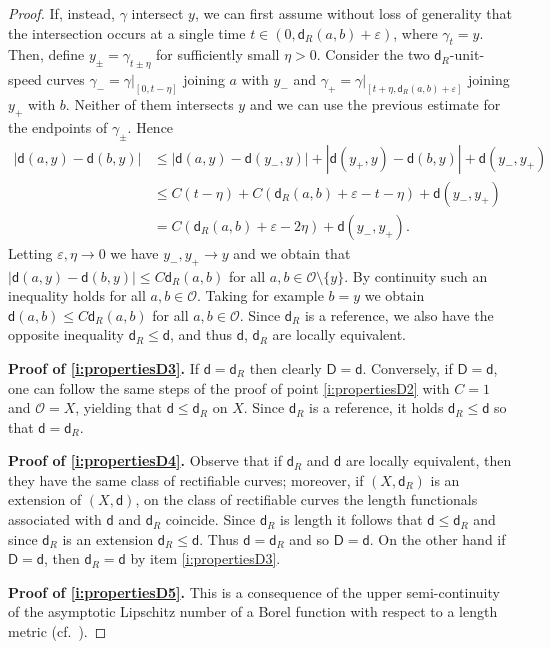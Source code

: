 \documentclass[11pt,a4paper]{article}
\theoremstyle{plain}
\theoremstyle{definition}
\theoremstyle{remark}
\numberwithin{equation}{section}
\newcommand{\sfd}{\mathsf d}
\newcommand{\sfD}{\mathsf D}
\begin{document}
\begin{proof}
If, instead, $\gamma$ intersect $y$, we can first assume without loss of generality that the intersection occurs at a single time $t \in (0,\sfd_R(a,b)+\varepsilon)$, where $\gamma_t = y$. Then, define $y_\pm =\gamma_{t\pm \eta}$ for sufficiently small $\eta>0$. Consider the two $\sfd_R$-unit-speed curves $\gamma_- = \gamma|_{[0,t-\eta]}$ joining $a$ with $y_-$ and $\gamma_+ = \gamma|_{[t+\eta,\sfd_R(a,b)+\varepsilon]}$ joining $y_+$ with $b$. Neither of them intersects $y$ and we can use the previous estimate for the endpoints of $\gamma_\pm$. Hence
\begin{align}
|\sfd(a,y)-\sfd(b,y)| & \leq |\sfd(a,y)-\sfd(y_-,y)| + |\sfd(y_+,y)-\sfd(b,y)| + \sfd(y_-,y_+) \\
& \leq C(t-\eta) + C(\sfd_R(a,b) +\varepsilon-t-\eta)   + \sfd(y_-,y_+) \\
& = C(\sfd_R(a,b)+\varepsilon-2\eta)  + \sfd(y_-,y_+).
\end{align}
Letting $\varepsilon,\eta\to 0$ we have $y_-,y_+ \to y$ and we obtain that $|\sfd(a,y)-\sfd(b,y)| \leq C \sfd_R(a,b)$ for all $a,b\in \mathcal{O}\setminus \{y\}$. By continuity such an inequality holds for all $a,b\in \mathcal{O}$. Taking for example $b=y$ we obtain $\sfd(a,b) \leq C \sfd_R(a,b)$ for all $a,b\in \mathcal{O}$. Since $\sfd_R$ is a reference, we also have the opposite inequality $\sfd_R\leq \sfd$, and thus $\sfd$, $\sfd_R$ are locally equivalent.

\textbf{Proof of \ref{i:propertiesD3}.} If $\sfd=\sfd_R$ then clearly $\sfD=\sfd$. Conversely, if $\sfD=\sfd$,  one can follow the same steps of the proof of point \ref{i:propertiesD2} with $C=1$ and $\mathcal{O}=X$, yielding that $\sfd\leq \sfd_R$ on $X$. Since $\sfd_R$ is a reference, it holds $\sfd_R\leq \sfd$ so that $\sfd=\sfd_R$.

\textbf{Proof of \ref{i:propertiesD4}.} Observe that if $\sfd_R$ and $\sfd$ are locally equivalent, then they have the same class of rectifiable curves; moreover, if $(X,\sfd_R)$ is an extension of $(X,\sfd)$, on the class of rectifiable curves the length functionals associated with $\sfd$ and $\sfd_R$ coincide. Since $\sfd_R$ is length it follows that $\sfd\leq \sfd_R$ and since $\sfd_R$ is an extension $\sfd_R\leq \sfd$. Thus $\sfd=\sfd_R$ and so $\sfD=\sfd$. On the other hand if $\sfD=\sfd$, then $\sfd_R =\sfd$ by item \ref{i:propertiesD3}.

\textbf{Proof of \ref{i:propertiesD5}.} This is a consequence of the upper semi-continuity of the asymptotic Lipschitz number of a Borel function with respect to a length metric  (cf.\ \cite{ACM-Sobolev}).
\end{proof}
\end{document}
